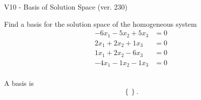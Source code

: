 \begin{exercise}
  \begin{exerciseTitle}V10 - Basis of Solution Space (ver. 230)\end{exerciseTitle}
  \begin{exerciseStatement}
    Find a basis for the solution space of the homogeneous system 
\begin{align*}
 -6 x_ 1 -5 x_ 2 + 5 x_ 3 &= 0  \\ 
  2 x_ 1 + 2 x_ 2 + 1 x_ 3 &= 0  \\ 
  1 x_ 1 + 2 x_ 2 -6 x_ 3 &= 0  \\ 
  -4 x_ 1 -1 x_ 2 -1 x_ 3 &= 0  \\ 
 \end{align*}


 
  \end{exerciseStatement}

  \begin{exerciseAnswer}
   A basis is   
\[\left\{\right\}.\]

  


  \end{exerciseAnswer}
\end{exercise}